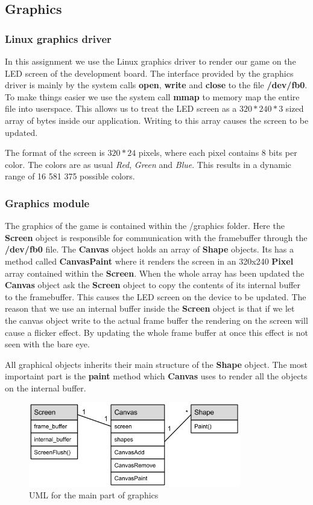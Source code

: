 \subsection{Graphics}

\subsubsection{Linux graphics driver}
In this assignment we use the Linux graphics driver to render our game on the LED screen of the
development board. The interface provided by the graphics driver is mainly by the system calls {\bf
  open}, {\bf write} and {\bf close} to the file {\bf /dev/fb0}. To make things easier we use the
system call {\bf mmap} to memory map the entire file into userspace. This allows us to treat the LED
screen as a $320 * 240 * 3$ sized array of bytes inside our application. Writing to this array
causes the screen to be updated.

The format of the screen is $320 * 24$ pixels, where each pixel contains 8 bits per color. The
colors are as usual {\it Red}, {\it Green} and {\it Blue}. This results in a dynamic range of 16 581
375 possible colors.

\subsubsection{Graphics module}
The graphics of the game is contained within the /graphics folder. Here the {\bf Screen} object is
responsible for communication with the framebuffer through the {\bf /dev/fb0} file. The {\bf Canvas}
object holds an array of {\bf Shape} objects. Its has a method called {\bf CanvasPaint} where it
renders the screen in an 320x240 {\bf Pixel} array contained within the {\bf Screen}. When the whole
array has been updated the {\bf Canvas} object ask the {\bf Screen} object to copy the contents of
its internal buffer to the framebuffer. This causes the LED screen on the device to be updated. The
reason that we use an internal buffer inside the {\bf Screen} object is that if we let the canvas
object write to the actual frame buffer the rendering on the screen will cause a flicker effect. By
updating the whole frame buffer at once this effect is not seen with the bare eye.

All graphical objects inherits their main structure of the {\bf Shape} object. The most importaint
part is the {\bf paint} method which {\bf Canvas} uses to render all the objects on the internal buffer.

\begin{figure}[h]
  \includegraphics[width=350px]{graphics/graphics_UML.png}
  \caption{UML for the main part of graphics}
\end{figure}

